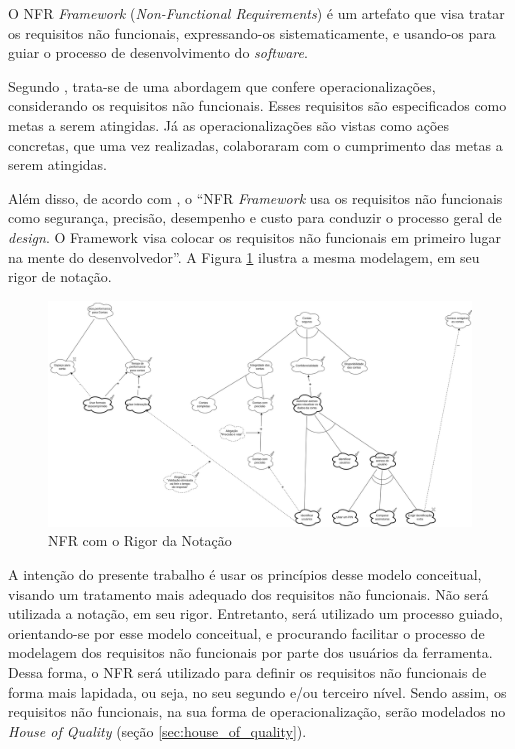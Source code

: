 \label{sec:nfr}

O NFR \textit{Framework} (\textit{Non-Functional Requirements}) é um artefato que visa tratar os requisitos não funcionais, expressando-os sistematicamente, e usando-os para guiar o processo de desenvolvimento do \textit{software}.

Segundo \cite{coutoproposta}, trata-se de uma abordagem que confere operacionalizações, considerando os requisitos não funcionais. Esses requisitos são especificados como metas a serem atingidas. Já as operacionalizações são vistas como ações concretas, que uma vez realizadas, colaboraram com o cumprimento das metas a serem atingidas.

Além disso, de acordo com \cite{chung2012non}, o “NFR \textit{Framework} usa os requisitos não funcionais como segurança, precisão, desempenho e custo para conduzir o processo geral de \textit{design}. O Framework visa colocar os requisitos não funcionais em primeiro lugar na mente do desenvolvedor”. A Figura \ref{fig:nfr_original} ilustra a mesma modelagem, em seu rigor de notação.

\begin{figure}[H]
    \begin{center}
        \caption{NFR com o Rigor da Notação}
        \label{fig:nfr_original}
        \includegraphics[scale=0.3]{figuras/Embasamento/nfr_rigor.png}
    \end{center}
\end{figure}


A intenção do presente trabalho é usar os princípios desse modelo conceitual, visando um tratamento mais adequado dos requisitos não funcionais. Não será utilizada a notação, em seu rigor. Entretanto, será utilizado um processo guiado, orientando-se por esse modelo conceitual, e procurando facilitar o processo de modelagem dos requisitos não funcionais por parte dos usuários da ferramenta. Dessa forma, o NFR será utilizado para definir os requisitos não funcionais de forma mais lapidada, ou seja, no seu segundo e/ou terceiro nível. Sendo assim, os requisitos não funcionais, na sua forma de operacionalização, serão modelados no \textit{House of Quality} (seção \ref{sec:house_of_quality}).

